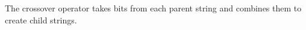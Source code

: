 \documentclass{report}
\begin{document}
\begin{sloppypar}
The crossover operator takes bits from each parent string and
combines them to create child strings.  
%
%
%
%
%

\end{sloppypar}
\end{document}
